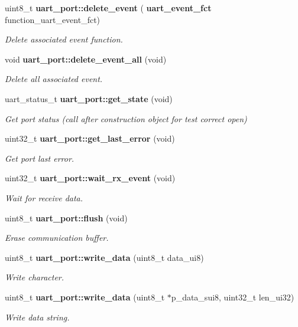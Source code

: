 \begin{DoxyCompactItemize}
uint8\+\_\+t \textbf{ uart\+\_\+port\+::delete\+\_\+event} (\textbf{ uart\+\_\+event\+\_\+fct} function\+\_\+uart\+\_\+event\+\_\+fct)
\begin{DoxyCompactList}\small\item\em Delete associated event function. \end{DoxyCompactList}\item 
void \textbf{ uart\+\_\+port\+::delete\+\_\+event\+\_\+all} (void)
\begin{DoxyCompactList}\small\item\em Delete all associated event. \end{DoxyCompactList}\item 
uart\+\_\+status\+\_\+t \textbf{ uart\+\_\+port\+::get\+\_\+state} (void)
\begin{DoxyCompactList}\small\item\em Get port status (call after construction object for test correct open) \end{DoxyCompactList}\item 
uint32\+\_\+t \textbf{ uart\+\_\+port\+::get\+\_\+last\+\_\+error} (void)
\begin{DoxyCompactList}\small\item\em Get port last error. \end{DoxyCompactList}\item 
uint32\+\_\+t \textbf{ uart\+\_\+port\+::wait\+\_\+rx\+\_\+event} (void)
\begin{DoxyCompactList}\small\item\em Wait for receive data. \end{DoxyCompactList}\item 
uint8\+\_\+t \textbf{ uart\+\_\+port\+::flush} (void)
\begin{DoxyCompactList}\small\item\em Erase communication buffer. \end{DoxyCompactList}\item 
uint8\+\_\+t \textbf{ uart\+\_\+port\+::write\+\_\+data} (uint8\+\_\+t data\+\_\+ui8)
\begin{DoxyCompactList}\small\item\em Write character. \end{DoxyCompactList}\item 
uint8\+\_\+t \textbf{ uart\+\_\+port\+::write\+\_\+data} (uint8\+\_\+t $\ast$p\+\_\+data\+\_\+sui8, uint32\+\_\+t len\+\_\+ui32)
\begin{DoxyCompactList}\small\item\em Write data string. \end{DoxyCompactList}\item 

\end{DoxyCompactItemize}
